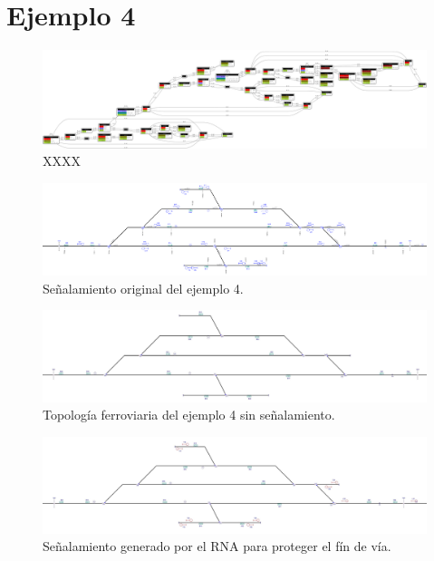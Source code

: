 \section{Ejemplo 4}

    \lipsum[1]
    
    \begin{figure}[h]
    	\centering
    	\includegraphics[width=1\textwidth]{Figuras/Graph_4}
    	\centering\caption{XXXX}
    \end{figure}
    
    \lipsum[1]

    \begin{figure}[h]
        \centering
        \includegraphics[width=1\textwidth]{resultados-obtenidos/ejemplo4/images/4_original.png}
        \centering\caption{Señalamiento original del ejemplo 4.}
    \end{figure}

    \lipsum[1]
    
    \begin{figure}[h]
        \centering
        \includegraphics[width=1\textwidth]{resultados-obtenidos/ejemplo4/images/4_empty.png}
        \centering\caption{Topología ferroviaria del ejemplo 4 sin señalamiento.}
    \end{figure}

    \begin{figure}[h]
        \centering
        \includegraphics[width=1\textwidth]{resultados-obtenidos/ejemplo4/images/4_step1.png}
        \centering\caption{Señalamiento generado por el RNA para proteger el fín de vía.}
    \end{figure}

